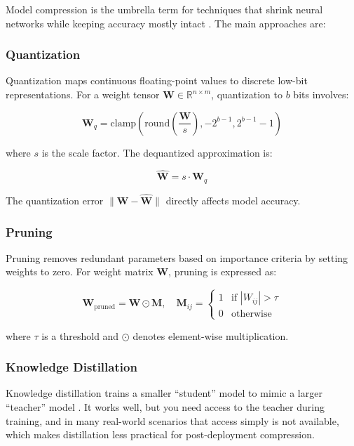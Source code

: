 \documentclass[journal]{IEEEtran}
\begin{document}
Model compression is the umbrella term for techniques that shrink neural networks while keeping accuracy mostly intact \cite{cheng2017survey}. The main approaches are:

\subsubsection{Quantization}

Quantization maps continuous floating-point values to discrete low-bit representations. For a weight tensor $\mathbf{W} \in \mathbb{R}^{n \times m}$, quantization to $b$ bits involves:

\begin{equation}
\mathbf{W}_q = \text{clamp}\!\left(\text{round}\!\left(\frac{\mathbf{W}}{s}\right), -2^{b-1}, 2^{b-1}-1\right)
\end{equation}

where $s$ is the scale factor. The dequantized approximation is:

\begin{equation}
\hat{\mathbf{W}} = s \cdot \mathbf{W}_q
\end{equation}

The quantization error $\|\mathbf{W} - \hat{\mathbf{W}}\|$ directly affects model accuracy.

\subsubsection{Pruning}

Pruning removes redundant parameters based on importance criteria by setting weights to zero. For weight matrix $\mathbf{W}$, pruning is expressed as:

\begin{equation}
\mathbf{W}_{\text{pruned}} = \mathbf{W} \odot \mathbf{M}, \quad \mathbf{M}_{ij} = \begin{cases} 1 & \text{if } |W_{ij}| > \tau \\ 0 & \text{otherwise} \end{cases}
\end{equation}

where $\tau$ is a threshold and $\odot$ denotes element-wise multiplication.

\subsubsection{Knowledge Distillation}

Knowledge distillation trains a smaller ``student'' model to mimic a larger ``teacher'' model \cite{hinton2015distilling}. It works well, but you need access to the teacher during training, and in many real-world scenarios that access simply is not available, which makes distillation less practical for post-deployment compression.
\end{document}
